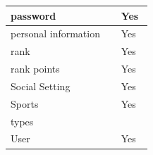 \documentclass[a4paper]{article}
\begin{document}
\begin{table}[h!]
\begin{minipage}{\textwidth}
\begin{minipage}[t]{0.48\textwidth}
\begin{tabular}{|p{0.7\linewidth}|p{0.2\linewidth}|}
					\hline
					password & Yes\\
					\hline
					personal information &Yes\\
					\hline
					rank & Yes\\
					\hline
					rank points & Yes\\
					\hline
					Social Setting & Yes\\
					\hline
					Sports & Yes\\
					\hline
					types & \\
					\hline
					User & Yes\\
					\hline
			 	\end{tabular}
		  	\end{minipage}
   		\end{minipage}
	\end{table}
\end{document}
